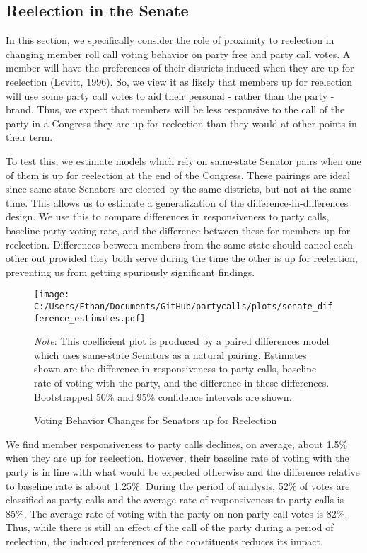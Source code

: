 \documentclass[12pt]{article}
\newcommand\fnote[1]{\captionsetup{font=small}\caption*{#1}}
\begin{document}
\subsection*{Reelection in the Senate}

In this section, we specifically consider the role of proximity to reelection in changing member roll call voting behavior on party free and party call votes. A member will have the preferences of their districts induced when they are up for reelection (Levitt, 1996). So, we view it as likely that members up for reelection will use some party call votes to aid their personal - rather than the party - brand. Thus, we expect that members will be less responsive to the call of the party in a Congress they are up for reelection than they would at other points in their term.

To test this, we estimate models which rely on same-state Senator pairs when one of them is up for reelection at the end of the Congress. These pairings are ideal since same-state Senators are elected by the same districts, but not at the same time. This allows us to estimate a generalization of the difference-in-differences design. We use this to compare differences in responsiveness to party calls, baseline party voting rate, and the difference between these for members up for reelection. Differences between members from the same state should cancel each other out provided they both serve during the time the other is up for reelection, preventing us from getting spuriously significant findings.

\begin{figure}[H]
	\centering
	\caption{Voting Behavior Changes for Senators up for Reelection}
	\texttt{[image: C:/Users/Ethan/Documents/GitHub/partycalls/plots/senate\_difference\_estimates.pdf]}
	\fnote{\textit{Note}: This coefficient plot is produced by a paired differences model which uses same-state Senators as a natural pairing. Estimates shown are the difference in responsiveness to party calls, baseline rate of voting with the party, and the difference in these differences. Bootstrapped 50\% and 95\% confidence intervals are shown.}
\end{figure}

We find member responsiveness to party calls declines, on average, about 1.5\% when they are up for reelection. However, their baseline rate of voting with the party is in line with what would be expected otherwise and the difference relative to baseline rate is about 1.25\%. During the period of analysis, 52\% of votes are classified as party calls and the average rate of responsiveness to party calls is 85\%. The average rate of voting with the party on non-party call votes is 82\%. Thus, while there is still an effect of the call of the party during a period of reelection, the induced preferences of the constituents reduces its impact.
\end{document}
